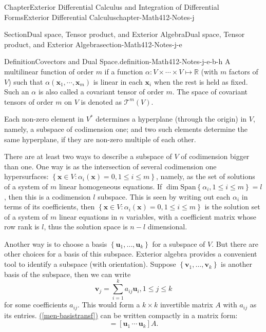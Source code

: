 \documentclass[oneside,10pt,]{book}
\newcommand{\xreffont}{\relax}
\numberwithin{equation}{section}
\newcommand{\bx}{\mathbf{x}}
\newcommand{\bbR}{\mathbb{R}}
\begin{document}
\begin{chapterptx}{Chapter}{Exterior Differential Calculus and Integration of Differential Forms}{}{Exterior Differential Calculus}{}{}{chapter-Math412-Notes-j}
\begin{sectionptx}{Section}{Dual space, Tensor product, and Exterior Algebra}{}{Dual space, Tensor product, and Exterior Algebra}{}{}{section-Math412-Notes-j-e}
\begin{definition}{Definition}{Covectors and Dual Space.}{definition-Math412-Notes-j-e-b-h}
A multilinear function of order \(m\) if a function \(\alpha:V\times\cdots\times V\mapsto \bbR\) (with \(m\) factors of \(V\)) such that \(\alpha(\bx_{1},\cdots, \bx_{m})\) is linear in each \(\bx_{i}\) when the rest is held as fixed. Such an \(\alpha\) is also called a covariant tensor of order \(m\). The space  of covariant tensors of order \(m\) on \(V\) is denoted as \({\mathcal T}^{m}(V)\).%
\end{definition}
 Each non-zero element in \(V^{*}\) determines a hyperplane (through the origin) in \(V\), namely, a subspace of codimension one; and two such elements determine the same hyperplane, if they are non-zero multiple of each other.%
\par
There are at least two ways to describe a subspace of \(V\) of codimension bigger than one. One way is as the intersection of several codimension one hypersurfaces: \(\left\{{\mathbf x}\in V: \alpha_{i} ({\mathbf x})=0, 1\le i \le m\right\}\), namely, as the set of solutions of a system of \(m\) linear homogeneous equations. If \(\dim \text{Span} \left\{ \alpha_{i}, 1\le i \le m\right\}=l\), then this is a codimension \(l\) subspace. This is seen by writing out each \(\alpha_{i}\) in terms of its coefficients, then \(\left\{{\mathbf x}\in V: \alpha_{i} ({\mathbf x})=0, 1\le i \le m\right\}\) is the solution set of a system of \(m\) linear equations in \(n\) variables, with a coefficient matrix whose row rank is \(l\), thus the solution space is \(n-l\) dimensional.%
\par
Another way is to choose a basis \(\left\{ {\mathbf u}_{1}, \ldots, {\mathbf u}_{k}\right\}\) for a subspace of \(V\). But there are other choices for a basis of this subspace. Exterior algebra provides a convenient tool to identify a subspace (with orientation). Suppose \(\left\{ {\mathbf v}_{1}, \ldots, {\mathbf v}_{k}\right\}\) is another basis of the subspace, then we can write%
\begin{equation}
{\mathbf v}_{j}=\sum_{i=1}^{k}a_{ij} {\mathbf u}_{i}, 1\le j \le k\label{men-basistransf}
\end{equation}
for some coefficients \(a_{ij} \). This would form a \(k\times k\) invertible matrix \(A\) with \(a_{ij} \) as its entries. \hyperref[men-basistransf]{({\xreffont\ref{men-basistransf}})} can be written compactly in a matrix form:%
\begin{equation}
[{\mathbf v}_{1}\, \cdots \,{\mathbf v}_{k}]=[{\mathbf u}_{1}\, \cdots \,{\mathbf u}_{k}]A.\label{men-basistransfm}
\end{equation}

\end{sectionptx}
\end{chapterptx}
\end{document}
